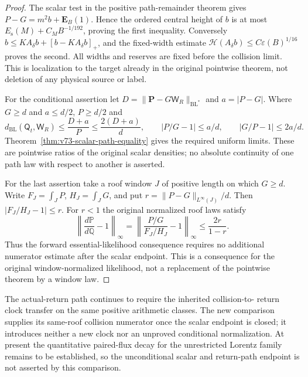 \begin{proof}
The scalar test in the positive path-remainder theorem gives
$P-G=m^2b+\mathbf E_B(1)$. Hence the ordered central height of
$b$ is at most $E_{\mathrm s}(M)+C_MB^{-1/192}$, proving the first
inequality. Conversely
$b\le KA_\delta b+[b-KA_\delta b]_+$, and the fixed-width estimate
$\mathcal H(A_\delta b)\le C\varepsilon(B)^{1/16}$ proves the
second. All widths and reserves are fixed before the collision
limit. This is localization to the target already in the original
pointwise theorem, not deletion of any physical source or label.

For the conditional assertion let
$D=\|\mathbf P-G\mathsf W_R\|_{\mathrm{BL}^*}$ and
$a=|P-G|$. Where $G\ge d$ and $a\le d/2$, $P\ge d/2$ and
\[
 d_{\mathrm{BL}}(\mathsf Q_t,\mathsf W_R)
       \le\frac{D+a}{P}\le\frac{2(D+a)}d,
 \qquad |P/G-1|\le a/d,\qquad |G/P-1|\le2a/d.
\]
Theorem~\ref{thm:v73-scalar-path-equality} gives the required uniform
limits. These are pointwise ratios of the original scalar densities;
no absolute continuity of one path law with respect to another is
asserted.

For the last assertion take a roof window $J$ of positive length
on which $G\ge d$. Write $F_J=\int_J P$, $H_J=\int_J G$,
and put $r=\|P-G\|_{L^\infty(J)}/d$. Then
$|F_J/H_J-1|\le r$. For $r<1$ the original normalized roof
laws satisfy
\[
 \left\|\frac{d\mathbb P}{d\mathbb Q}-1\right\|_\infty
 =\left\|\frac{P/G}{F_J/H_J}-1\right\|_\infty
                         \le\frac{2r}{1-r}.
\]
Thus the forward essential-likelihood consequence requires no
additional numerator estimate after the scalar endpoint. This is
a consequence for the original window-normalized likelihood, not
a replacement of the pointwise theorem by a window law.
\end{proof}

The actual-return path continues to require the inherited collision-to-
return clock transfer on the same positive arithmetic classes. The
new comparison supplies its same-roof collision numerator once the
scalar endpoint is closed; it introduces neither a new clock nor an
unproved conditional normalization. At present the quantitative
paired-flux decay for the unrestricted Lorentz family remains to be
established, so the unconditional scalar and return-path endpoint is
not asserted by this comparison.
\label{end:v73-new-mathematics}
